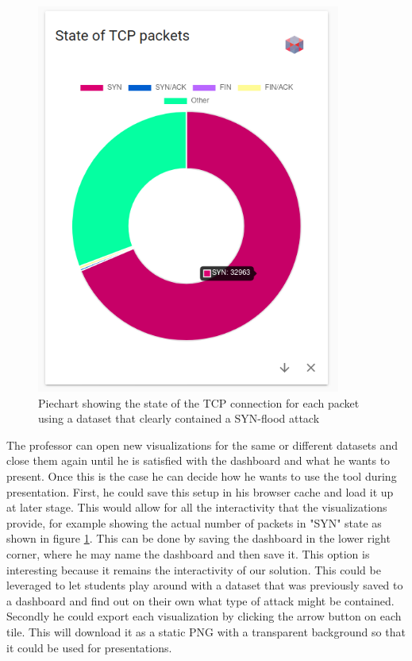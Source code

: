 \begin{figure}[]
    \centering
    \includegraphics[width=10cm]{images/evaluation-synflood-piechart.png}
    \caption{Piechart showing the state of the TCP connection for each packet using a dataset that clearly contained a SYN-flood attack}
    \label{fig:synfloodpiechart}
\end{figure}
The professor can open new visualizations for the same or different datasets and close them again until he is satisfied with the dashboard and what he wants to present. Once this is the case he can decide how he wants to use the tool during presentation. First, he could save this setup in his browser cache and load it up at later stage. This would allow for all the interactivity that the visualizations provide, for example showing the actual number of packets in "SYN" state as shown in figure \ref{fig:synfloodpiechart}. This can be done by saving the dashboard in the lower right corner, where he may name the dashboard and then save it. This option is interesting because it remains the interactivity of our solution. This could be leveraged to let students play around with a dataset that was previously saved to a dashboard and find out on their own what type of attack might be contained.
Secondly he could export each visualization by clicking the arrow button on each tile. This will download it as a static PNG with a transparent background so that it could be used for presentations.
